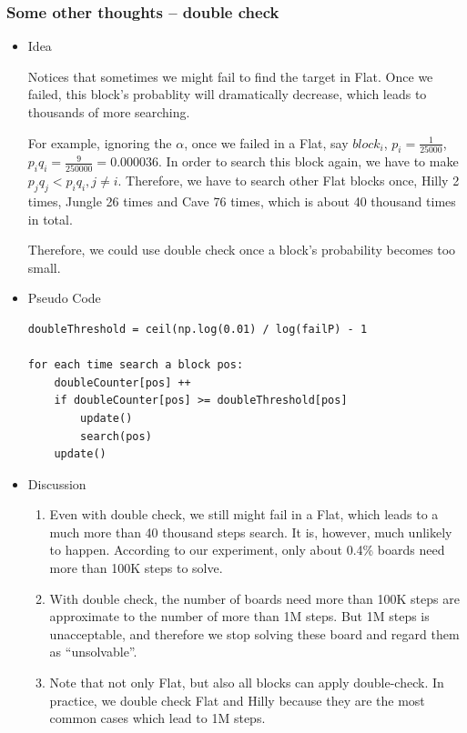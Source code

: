 \documentclass[letter]{article}
\begin{document}
\subsubsection{Some other thoughts -- double check}
\begin{itemize}
	\item {Idea} 
	\par{Notices that sometimes we might fail to find the target in Flat. Once we failed, this block’s probablity will dramatically decrease, which leads to thousands of more searching.}
	
	\par{For example, ignoring the $\alpha$, once we failed in a Flat, say $block_i$, $p_i = \frac{1}{25000}$, $p_iq_i = \frac{9}{250000} = 0.000036$. In order to search this block again, we have to make $p_jq_j < p_iq_i, j \ne i$. Therefore, we have to search other Flat blocks once, Hilly 2 times, Jungle 26 times and Cave 76 times, which is about 40 thousand times in total.}
	
	\par{Therefore, we could use double check once a block’s probability becomes too small.}
	\item {Pseudo Code} 
	\begin{lstlisting}
doubleThreshold = ceil(np.log(0.01) / log(failP) - 1

for each time search a block pos:
	doubleCounter[pos] ++
	if doubleCounter[pos] >= doubleThreshold[pos]
		update()
		search(pos)
	update()
	\end{lstlisting}
	\item {Discussion} 
	\begin{enumerate}
		\item {Even with double check, we still might fail in a Flat, which leads to a much more than 40 thousand steps search. It is, however, much unlikely to happen. According to our experiment, only about 0.4\% boards need more than 100K steps to solve.}
		\item {With double check, the number of boards need more than 100K steps are approximate to the number of more than 1M steps. But 1M steps is unacceptable, and therefore we stop solving these board and regard them as ``unsolvable''.}
		\item {Note that not only Flat, but also all blocks can apply double-check. In practice, we double check Flat and Hilly because they are the most common cases which lead to 1M steps.}
	\end{enumerate}
\end{itemize}
\end{document}
